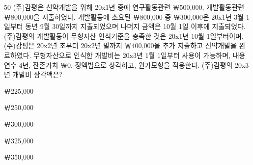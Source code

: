 \begin{question}{50}
(주)감평은 신약개발을 위해 20x1년 중에 연구활동관련 ￦500,000, 개발활동관련 ￦800,000을 지출하였다. 개발활동에 소요된 ￦800,000 중 ￦300,000은 20x1년 3월 1일부터 동년 9월 30일까지 지출되었으며 나머지 금액은 10월 1일 이후에 지출되었다. (주)감평의 개발활동이 무형자산 인식기준을 충족한 것은 20x1년 10월 1일부터이며, (주)감평은 20x2년 초부터 20x2년 말까지 ￦400,000을 추가 지출하고 신약개발을 완료하였다. 무형자산으로 인식한 개발비는 20x3년 1월 1일부터 사용이 가능하며, 내용연수 4년, 잔존가치 ￦0, 정액법으로 상각하고, 원가모형을 적용한다. (주)감평의 20x3년 개발비 상각액은?
\begin{choices}
  \item ￦225,000
  \item ￦250,000
  \item ￦300,000
  \item ￦325,000
  \item ￦350,000
\end{choices}
\end{question}
